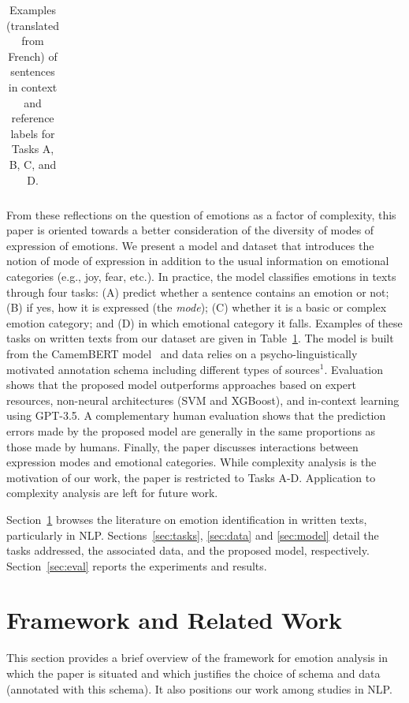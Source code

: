 \begin{table}[t!]
\begin{center}
\begin{tabular}{@{}p{7cm}||@{~}c@{~}||@{}c@{}|@{}c@{}|@{}c@{}|@{}c@{}||@{}c@{}|@{}c@{}||@{}c@{}|@{}c@{}|@{}c@{}|@{}c@{}|@{}c@{}|@{}c@{}|@{}c@{}|@{}c@{}|@{}c@{}|@{}c@{}|@{}c@{}|@{}c@{}|@{}c@{}}
        \end{tabular}
\caption{Examples (translated from French) of sentences in context and reference labels for Tasks A, B, C, and D.}
\label{tab:examples}
\end{center}
\end{table}

From these reflections on the question of emotions as a factor of complexity, this paper is oriented towards a better consideration of the diversity of modes of expression of emotions. We present a model and dataset that introduces the notion of mode of expression in addition to the usual information on emotional categories (e.g., joy, fear, etc.). In practice, the model classifies emotions in texts through four tasks: (A) predict whether a sentence contains an emotion or not; (B) if yes, how it is expressed (the \textit{mode}); (C) whether it is a basic or complex emotion category; and (D) in which emotional category it falls. Examples of these tasks on written texts from our dataset are given in Table~\ref{tab:examples}.
%
The model is built from the CamemBERT model~\citep{martin_camembert_2020} and data relies on a psycho-linguistically motivated annotation schema including different types of sources$^1$.
%
Evaluation shows that the proposed model outperforms approaches based on expert resources, non-neural architectures (SVM and XGBoost), and in-context learning using GPT-3.5.
%
A complementary human evaluation shows that the prediction errors made by the proposed model are generally in the same proportions as those made by humans. Finally, the paper discusses interactions between expression modes and emotional categories.
%
While complexity analysis is the motivation of our work, the paper is restricted to Tasks A-D. Application to complexity analysis are left for future work.


Section~\ref{sec:literature} browses the literature on emotion identification in written texts, particularly in NLP. Sections~\ref{sec:tasks}, \ref{sec:data} and \ref{sec:model} detail the tasks addressed, the associated data, and the proposed model, respectively. Section~\ref{sec:eval} reports the experiments and results.


\section{Framework and Related Work}
\label{sec:literature}

%
This section provides a brief overview of the framework for emotion analysis in which the paper is situated and which justifies the choice of schema and data (annotated with this schema). It also positions our work among studies in NLP.

